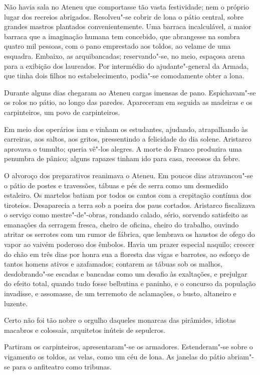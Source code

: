 Não havia sala no Ateneu que comportasse tão
vasta festividade; nem o próprio lugar dos recreios abrigados.
Resolveu"-se cobrir de lona o pátio central, sobre grandes mastros
plantados convenientemente. Uma barraca incalculável, a maior barraca
que a imaginação humana tem concebido, que abrangesse na sombra quatro
mil pessoas, com o pano emprestado aos toldos, ao velame de uma
esquadra. Embaixo, as arquibancadas; reservando"-se, no meio, espaçosa
arena para a exibição dos laureados. Por intermédio do
ajudante"-general da Armada, que tinha dois filhos no estabelecimento,
podia"-se comodamente obter a lona. 

Durante alguns dias chegaram ao
Ateneu cargas imensas de pano. Espichavam"-se os rolos no pátio,
ao longo das paredes. Apareceram em seguida as madeiras e os
carpinteiros, um povo de carpinteiros. 

Em meio dos operários iam e
vinham os estudantes, ajudando, atrapalhando às carreiras, aos saltos,
aos gritos, pressentindo a felicidade do dia solene. Aristarco aprovava
o tumulto; queria vê"-los alegres. A morte do Franco produzira uma
penumbra de pânico; alguns rapazes tinham ido para casa, receosos da
febre. 

O alvoroço dos preparativos reanimava o Ateneu. Em poucos dias
atravancou"-se o pátio de postes e travessões, tábuas e pés de serra
como um desmedido estaleiro. Os martelos batiam por todos os cantos com
a crepitação contínua dos tiroteios. Desaparecia a terra sob a poeira
dos paus cortados. Aristarco fiscalizava o serviço como
mestre"-de"-obras, rondando calado, sério, sorvendo satisfeito as
emanações da serragem fresca, cheiro de oficina, cheiro do trabalho,
ouvindo atritar os serrotes com um rumor de fábrica, que lembrava os
haustos de ofego do vapor ao vaivém poderoso dos êmbolos. Havia um
prazer especial naquilo; crescer do chão em três dias por honra sua a
floresta das vigas e barrotes, ao esforço de tantos homens ativos e
azafamados; contarem as tábuas sob os malhos, desdobrando"-se escadas
e bancadas como um desafio às exaltações, e prejulgar do efeito total,
quando tudo fosse belbutina e paninho, e o concurso da população
invadisse, e assomasse, de um terremoto de aclamações, o busto,
altaneiro e luzente. 

Certo não foi tão nobre o orgulho daqueles
monarcas das pirâmides, idiotas macabros e colossais, arquitetos
inúteis de sepulcros. 

Partiram os carpinteiros, apresentaram"-se os
armadores. Estenderam"-se sobre o vigamento os toldos, as velas, como
um céu de lona. As janelas do pátio abriam"-se para o anfiteatro como
tribunas. 

